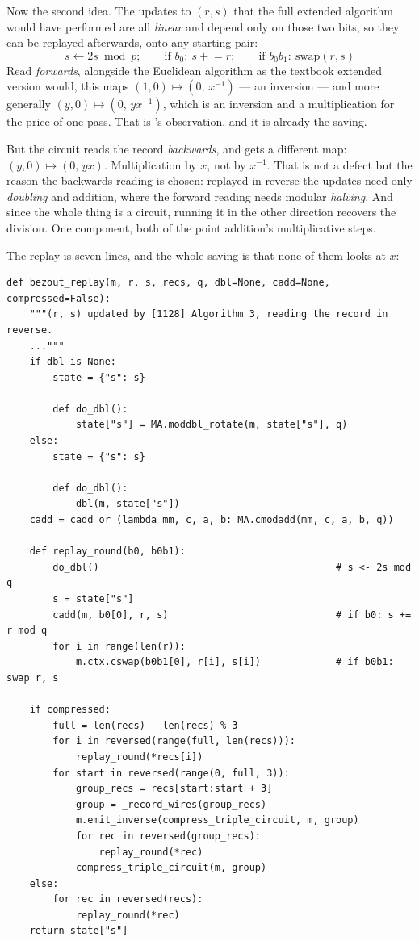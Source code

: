 \documentclass[11pt]{article}
\theoremstyle{plain}
\theoremstyle{remark}
\begin{document}
\noindent
Now the second idea. The updates to $(r,s)$ that the full extended algorithm would have performed
are all \emph{linear} and depend only on those two bits, so they can be replayed afterwards, onto
any starting pair:
\[
s \leftarrow 2s \bmod p; \qquad \text{if } b_0:\ s \mathrel{+}= r; \qquad \text{if } b_0b_1:\ \text{swap}(r,s)
\]
Read \emph{forwards}, alongside the Euclidean algorithm as the textbook extended version would,
this maps $(1,0)\mapsto(0,\,x^{-1})$ --- an inversion --- and more generally
$(y,0)\mapsto(0,\,yx^{-1})$, which is an inversion and a multiplication for the price of one pass.
That is \cite{ec:schrott26}'s observation, and it is already the saving.

But the circuit reads the record \emph{backwards}, and gets a different map:
$(y,0)\mapsto(0,\,yx)$. Multiplication by $x$, not by $x^{-1}$. That is not a defect but the
reason the backwards reading is chosen: replayed in reverse the updates need only \emph{doubling}
and addition, where the forward reading needs modular \emph{halving}. And since the whole thing is
a circuit, running it in the other direction recovers the division. One component, both of the
point addition's multiplicative steps.

The replay is seven lines, and the whole saving is that none of them looks at $x$:

\begin{lstlisting}
def bezout_replay(m, r, s, recs, q, dbl=None, cadd=None, compressed=False):
    """(r, s) updated by [1128] Algorithm 3, reading the record in reverse.
    ..."""
    if dbl is None:
        state = {"s": s}

        def do_dbl():
            state["s"] = MA.moddbl_rotate(m, state["s"], q)
    else:
        state = {"s": s}

        def do_dbl():
            dbl(m, state["s"])
    cadd = cadd or (lambda mm, c, a, b: MA.cmodadd(mm, c, a, b, q))

    def replay_round(b0, b0b1):
        do_dbl()                                         # s <- 2s mod q
        s = state["s"]
        cadd(m, b0[0], r, s)                             # if b0: s += r mod q
        for i in range(len(r)):
            m.ctx.cswap(b0b1[0], r[i], s[i])             # if b0b1: swap r, s

    if compressed:
        full = len(recs) - len(recs) % 3
        for i in reversed(range(full, len(recs))):
            replay_round(*recs[i])
        for start in reversed(range(0, full, 3)):
            group_recs = recs[start:start + 3]
            group = _record_wires(group_recs)
            m.emit_inverse(compress_triple_circuit, m, group)
            for rec in reversed(group_recs):
                replay_round(*rec)
            compress_triple_circuit(m, group)
    else:
        for rec in reversed(recs):
            replay_round(*rec)
    return state["s"]
\end{lstlisting}
\end{document}
